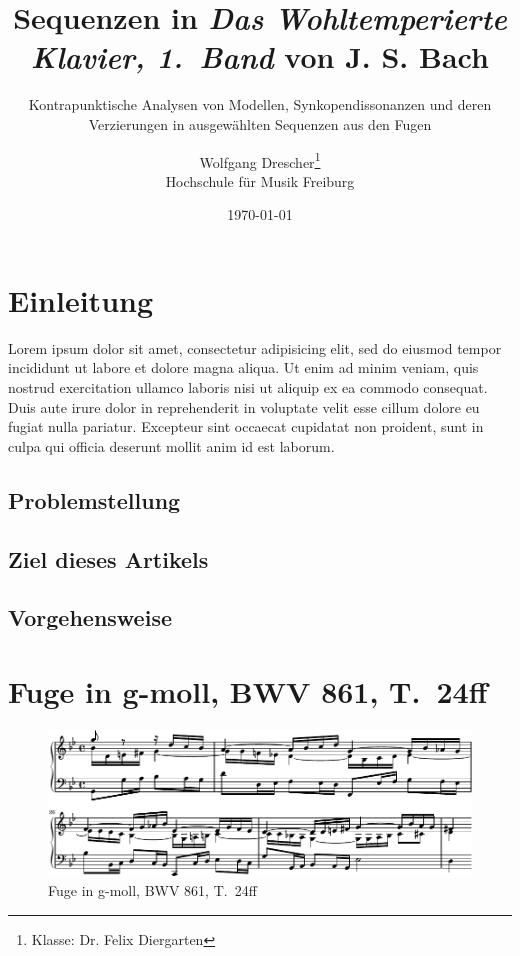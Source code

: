\documentclass[a4paper]{scrartcl}
\title{Sequenzen in \emph{Das Wohltemperierte Klavier, 1.~Band} von J. S. Bach}
\subtitle{Kontrapunktische Analysen von Modellen, Synkopendissonanzen und deren Verzierungen in ausgewählten Sequenzen aus den Fugen}
\author{
	Wolfgang Drescher\thanks{Klasse: Dr. Felix Diergarten}\\
	Hochschule für Musik Freiburg
}
\date{\today}
\begin{document}
\maketitle

\tableofcontents

\section{Einleitung}

Lorem ipsum dolor sit amet, consectetur adipisicing elit, sed do eiusmod tempor incididunt ut labore et dolore magna aliqua. Ut enim ad minim veniam, quis nostrud exercitation ullamco laboris nisi ut aliquip ex ea commodo consequat. Duis aute irure dolor in reprehenderit in voluptate velit esse cillum dolore eu fugiat nulla pariatur. Excepteur sint occaecat cupidatat non proident, sunt in culpa qui officia deserunt mollit anim id est laborum.

\subsection{Problemstellung}

\subsection{Ziel dieses Artikels}

\subsection{Vorgehensweise}

\section{Fuge in g-moll, BWV 861, T.~24ff}

\begin{figure}[htbp]
	\centering
	\includegraphics{lilypond/g-moll/render/original}
	\caption{Fuge in g-moll, BWV 861, T.~24ff}
	\label{fig:bwv681-original}
\end{figure}

\printindex

\renewcommand{\indexname}{Stichwortverzeichnis}
\listoffigures
\end{document}
